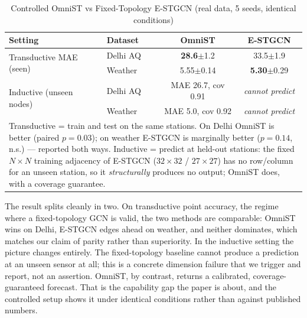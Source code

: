 \documentclass[journal]{IEEEtran}
\begin{document}
\begin{table}[htbp]
\caption{Controlled OmniST vs Fixed-Topology E-STGCN (real data, 5 seeds, identical conditions)}
\centering
\begin{tabular}{llcc}
\toprule
\textbf{Setting} & \textbf{Dataset} & \textbf{OmniST} & \textbf{E-STGCN} \\
\midrule
\multirow{2}{*}{Transductive MAE (seen)} & Delhi AQ & \textbf{28.6}$\pm$1.2 & 33.5$\pm$1.9 \\
                                          & Weather  & 5.55$\pm$0.14 & \textbf{5.30}$\pm$0.29 \\
\midrule
\multirow{2}{*}{Inductive (unseen nodes)} & Delhi AQ & MAE 26.7, cov 0.91 & \emph{cannot predict} \\
                                          & Weather  & MAE 5.0, cov 0.92 & \emph{cannot predict} \\
\bottomrule
\multicolumn{4}{p{0.95\columnwidth}}{\footnotesize Transductive = train and test on the same stations.
On Delhi OmniST is better (paired $p{=}0.03$); on weather E-STGCN is marginally better ($p{=}0.14$,
n.s.) --- reported both ways. Inductive = predict at held-out stations: the fixed $N{\times}N$ training
adjacency of E-STGCN ($32{\times}32$ / $27{\times}27$) has no row/column for an unseen station, so it
\emph{structurally} produces no output; OmniST does, with a coverage guarantee.} \\
\end{tabular}
\label{tab:controlled}
\end{table}

The result splits cleanly in two. On transductive point accuracy, the regime where a fixed-topology
GCN is valid, the two methods are comparable: OmniST wins on Delhi, E-STGCN edges ahead on weather,
and neither dominates, which matches our claim of parity rather than superiority. In the inductive
setting the picture changes entirely. The fixed-topology baseline cannot produce a prediction at an
unseen sensor at all; this is a concrete dimension failure that we trigger and report, not an
assertion. OmniST, by contrast, returns a calibrated, coverage-guaranteed forecast. That is the
capability gap the paper is about, and the controlled setup shows it under identical conditions rather
than against published numbers.
\end{document}
